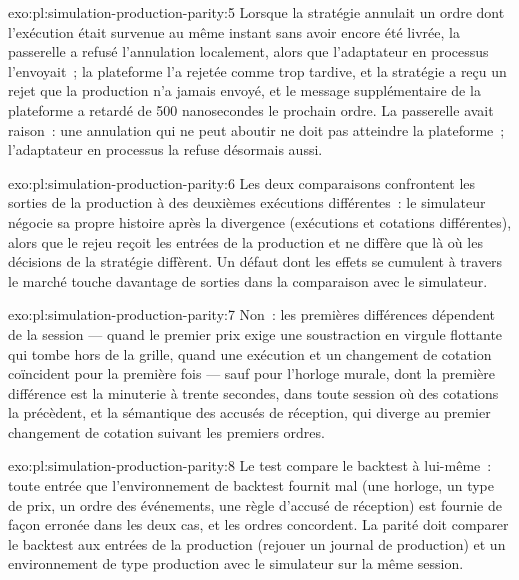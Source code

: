 \begin{solution}{exo:pl:simulation-production-parity:5}
Lorsque la stratégie annulait un ordre dont l'exécution était survenue au même instant sans avoir encore été livrée, la passerelle a refusé l'annulation
localement, alors que l'adaptateur en processus l'envoyait~; la plateforme l'a rejetée comme trop tardive, et la stratégie a reçu un rejet que la production
n'a jamais envoyé, et le message supplémentaire de la plateforme a retardé de 500 nanosecondes le prochain ordre. La passerelle avait raison~: une annulation qui ne peut aboutir ne doit
pas atteindre la plateforme~; l'adaptateur en processus la refuse désormais aussi.
\end{solution}

\begin{solution}{exo:pl:simulation-production-parity:6}
Les deux comparaisons confrontent les sorties de la production à des deuxièmes exécutions différentes~: le simulateur négocie sa propre histoire après la divergence
(exécutions et cotations différentes), alors que le rejeu reçoit les entrées de la production et ne diffère que là où les décisions de la stratégie diffèrent.
Un défaut dont les effets se cumulent à travers le marché touche davantage de sorties dans la comparaison avec le simulateur.
\end{solution}

\begin{solution}{exo:pl:simulation-production-parity:7}
Non~: les premières différences dépendent de la session --- quand le premier prix exige une soustraction en virgule flottante qui tombe hors de la grille, quand une exécution et
un changement de cotation coïncident pour la première fois --- sauf pour l'horloge murale, dont la première différence est la minuterie à trente secondes, dans toute session où des cotations la précèdent, et
la sémantique des accusés de réception, qui diverge au premier changement de cotation suivant les premiers ordres.
\end{solution}

\begin{solution}{exo:pl:simulation-production-parity:8}
Le test compare le backtest à lui-même~: toute entrée que l'environnement de backtest fournit mal (une horloge, un type de prix, un ordre des événements, une
règle d'accusé de réception) est fournie de façon erronée dans les deux cas, et les ordres concordent. La parité doit comparer le backtest aux entrées de la production
(rejouer un journal de production) et un environnement de type production avec le simulateur sur la même session.
\end{solution}

